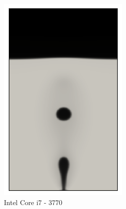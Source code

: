 \begin{figure}[H]
	\centering
	\begin{subfigure}{0.35\textwidth}
		\includegraphics[width=\linewidth]{figs/cap4/bb_760_s45}
		\caption{Intel Core i7 - 3770}
		\label{fig:b_sp_760}\hfil
	\end{subfigure}
	\begin{subfigure}{0.35\textwidth}

\end{subfigure}
\end{figure}
